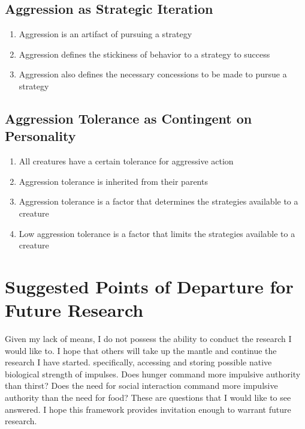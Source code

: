 \documentclass[12pt]{article}
\begin{document}
\subsection{Aggression as Strategic Iteration}
\begin{enumerate}
    \item Aggression is an artifact of pursuing a strategy
    \item Aggression defines the stickiness of behavior to a strategy to success
    \item Aggression also defines the necessary concessions to be made to pursue a strategy
\end{enumerate}
\subsection{Aggression Tolerance as Contingent on Personality}
\begin{enumerate}
    \item All creatures have a certain tolerance for aggressive action
    \item Aggression tolerance is inherited from their parents
    \item Aggression tolerance is a factor that determines the strategies available to a creature
    \item Low aggression tolerance is a factor that limits the strategies available to a creature
\end{enumerate}

\section{Suggested Points of Departure for Future Research}
Given my lack of means, I do not possess the ability to conduct the research I would like to.
I hope that others will take up the mantle and continue the research I have started.
specifically, accessing and storing possible native biological strength of impulses.
Does hunger command more impulsive authority than thirst?
Does the need for social interaction command more impulsive authority than the need for food?
These are questions that I would like to see answered.
I hope this framework provides invitation enough to warrant future research.
\end{document}
